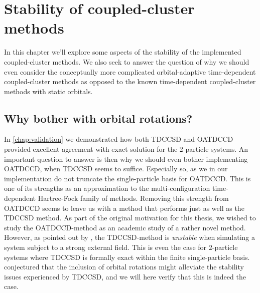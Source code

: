 \chapter{Stability of coupled-cluster methods}
    \label{chap:stability}
    In this chapter we'll explore some aspects of the stability of the
    implemented coupled-cluster methods.
    We also seek to answer the question of why we should even consider the
    conceptually more complicated orbital-adaptive time-dependent
    coupled-cluster methods as opposed to the known time-dependent
    coupled-cluster methods with static orbitals.

    \section{Why bother with orbital rotations?}
        In \autoref{chap:validation} we demonstrated how both TDCCSD and OATDCCD
        provided excellent agreement with exact solution for the $2$-particle
        systems.
        An important question to answer is then why we should even bother
        implementing OATDCCD, when TDCCSD seems to suffice.
        Especially so, as we in our implementation do not truncate the
        single-particle basis for OATDCCD.
        This is one of its strengths as an approximation to the
        multi-configuration time-dependent Hartree-Fock family of methods.
        Removing this strength from OATDCCD seems to leave us with a method that
        performs just as well as the TDCCSD method.
        As part of the original motivation for this thesis, we wished to study
        the OATDCCD-method as an academic study of a rather novel method.
        However, as pointed out by \citeauthor{pedersen2018symplectic}
        \cite{pedersen2018symplectic}, the TDCCSD-method is \emph{unstable} when
        simulating a system subject to a strong external field.
        This is even the case for $2$-particle systems where TDCCSD is formally
        exact within the finite single-particle basis.
        \citeauthor{pedersen2018symplectic} conjectured that the inclusion of
        orbital rotations might alleviate the stability issues experienced by
        TDCCSD, and we will here verify that this is indeed the case.

